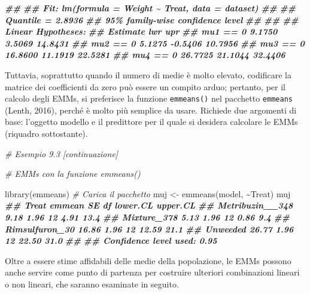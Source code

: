 \documentclass[
  12pt,
]{book}
\newenvironment{Shaded}{\begin{snugshade}}{\end{snugshade}}
\newcommand{\CommentTok}[1]{\textcolor[rgb]{0.56,0.35,0.01}{\textit{#1}}}
\newcommand{\DocumentationTok}[1]{\textcolor[rgb]{0.56,0.35,0.01}{\textbf{\textit{#1}}}}
\newcommand{\FunctionTok}[1]{\textcolor[rgb]{0.00,0.00,0.00}{#1}}
\newcommand{\NormalTok}[1]{#1}
\newcommand{\OtherTok}[1]{\textcolor[rgb]{0.56,0.35,0.01}{#1}}
\newcommand{\SpecialCharTok}[1]{\textcolor[rgb]{0.00,0.00,0.00}{#1}}
\begin{document}
\begin{Shaded}
\begin{Highlighting}[]
\DocumentationTok{\#\# }
\DocumentationTok{\#\# Fit: lm(formula = Weight \textasciitilde{} Treat, data = dataset)}
\DocumentationTok{\#\# }
\DocumentationTok{\#\# Quantile = 2.8936}
\DocumentationTok{\#\# 95\% family{-}wise confidence level}
\DocumentationTok{\#\#  }
\DocumentationTok{\#\# }
\DocumentationTok{\#\# Linear Hypotheses:}
\DocumentationTok{\#\#          Estimate lwr     upr    }
\DocumentationTok{\#\# mu1 == 0  9.1750   3.5069 14.8431}
\DocumentationTok{\#\# mu2 == 0  5.1275  {-}0.5406 10.7956}
\DocumentationTok{\#\# mu3 == 0 16.8600  11.1919 22.5281}
\DocumentationTok{\#\# mu4 == 0 26.7725  21.1044 32.4406}
\end{Highlighting}
\end{Shaded}

Tuttavia, soprattutto quando il numero di medie è molto elevato, codificare la matrice dei coefficienti da zero può essere un compito arduo; pertanto, per il calcolo degli EMMs, si preferisce la funzione \texttt{emmeans()} nel pacchetto \texttt{emmeans} (Lenth, 2016), perché è molto più semplice da usare. Richiede due argomenti di base: l'oggetto modello e il predittore per il quale si desidera calcolare le EMMs (riquadro sottostante).

\begin{Shaded}
\begin{Highlighting}[]
\CommentTok{\# Esempio 9.3 [continuazione]}

\CommentTok{\# EMMs con la funzione \textquotesingle{}emmeans()\textquotesingle{}}

\FunctionTok{library}\NormalTok{(emmeans) }\CommentTok{\# Carica il pacchetto}
\NormalTok{muj }\OtherTok{\textless{}{-}} \FunctionTok{emmeans}\NormalTok{(model, }\SpecialCharTok{\textasciitilde{}}\NormalTok{Treat)}
\NormalTok{muj}
\DocumentationTok{\#\#  Treat           emmean   SE df lower.CL upper.CL}
\DocumentationTok{\#\#  Metribuzin\_\_348   9.18 1.96 12     4.91     13.4}
\DocumentationTok{\#\#  Mixture\_378       5.13 1.96 12     0.86      9.4}
\DocumentationTok{\#\#  Rimsulfuron\_30   16.86 1.96 12    12.59     21.1}
\DocumentationTok{\#\#  Unweeded         26.77 1.96 12    22.50     31.0}
\DocumentationTok{\#\# }
\DocumentationTok{\#\# Confidence level used: 0.95}
\end{Highlighting}
\end{Shaded}

Oltre a essere stime affidabili delle medie della popolazione, le EMMs possono anche servire come punto di partenza per costruire ulteriori combinazioni lineari o non lineari, che saranno esaminate in seguito.
\end{document}
